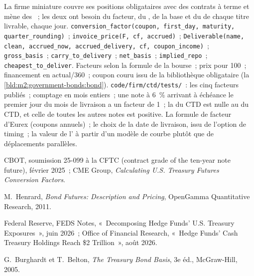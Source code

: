 \begin{build}
 La firme miniature couvre ses positions obligataires avec des contrats à terme
et mène des ~; les deux ont besoin du facteur, du , de la base et
du  de chaque titre livrable, chaque jour.  \texttt{conversion\_factor(coupon, first\_day, maturity,
quarter\_rounding)}~; \texttt{invoice\_price(F, cf, accrued)}~; \texttt{Deliverable(name, clean, accrued\_now, accrued\_delivery, cf,
coupon\_income)}~; \texttt{gross\_basis}~; \texttt{carry\_to\_delivery}~;
\texttt{net\_basis}~; \texttt{implied\_repo}~; \texttt{cheapest\_to\_deliver}.
 Facteurs selon la formule de la bourse~; prix pour 100~; financement en
actual/360~; coupon couru issu de la bibliothèque obligataire
(la \cref{bld:m2:government-bonds:bond}).
 \texttt{code/firm/ctd/tests/}~: les cinq
facteurs publiés~; comptage en mois entiers~; une note à 6~\% arrivant à échéance le premier jour du
mois de livraison a un facteur de 1~; la  du CTD est nulle au
 du CTD, et celle de toutes les autres notes est positive.
 La formule de facteur d'Eurex (coupons annuels)~; le choix de la
date de livraison, issu de l'option de timing~; la valeur de l' à partir
d'un modèle de courbe plutôt que de déplacements parallèles.
\end{build}

\begin{omsources}
\item CBOT, soumission 25-099 à la CFTC (contract grade of the ten-year note
future), février 2025~; CME Group, \emph{Calculating U.S. Treasury Futures
Conversion Factors}.
\item M.\ Henrard, \emph{Bond Futures: Description and Pricing}, OpenGamma
Quantitative Research, 2011.
\item Federal Reserve, FEDS Notes, «~Decomposing Hedge Funds' U.S. Treasury
Exposures~», juin 2026~; Office of Financial Research, «~Hedge Funds' Cash
Treasury Holdings Reach \$2 Trillion~», août 2026.
\item G.\ Burghardt et T.\ Belton, \emph{The Treasury Bond Basis}, 3e éd.,
McGraw-Hill, 2005.
\end{omsources}

